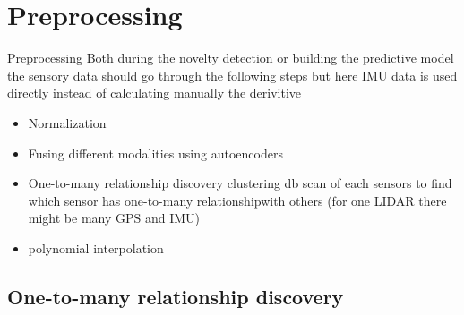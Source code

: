 \section{Preprocessing}
    \begin{frame}[allowframebreaks]{Preprocessing}
        Both during the novelty detection or building the predictive model the sensory data should go through the following steps but here IMU data is used directly instead of calculating manually the derivitive
        \begin{itemize}
            \item Normalization
            \item Fusing different modalities using autoencoders
            \item One-to-many relationship discovery clustering db scan of each sensors to find which sensor has one-to-many relationshipwith others (for one LIDAR there might be many GPS and IMU)
            \item polynomial interpolation
        \end{itemize}
    
    \end{frame}
    
    \subsection{One-to-many relationship discovery}
        